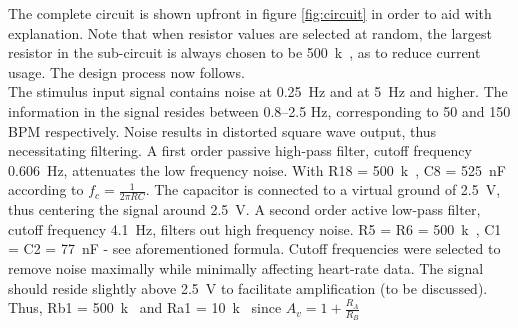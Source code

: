 The complete circuit is shown upfront in figure \ref{fig:circuit} in order to aid with explanation. Note that when resistor values are selected at random, the largest resistor in the sub-circuit is always chosen to be \SI{500}{k\Omega}, as to reduce current usage. The design process now follows.\\
The stimulus input signal contains noise at \SI{0.25}{Hz} and at \SI{5}{Hz} and higher. The information in the signal resides between \numrange{0.8}{2.5} \si{Hz}, corresponding to 50 and 150 BPM respectively. Noise results in distorted square wave output, thus necessitating filtering. A first order passive high-pass filter, cutoff frequency \SI{0.606}{Hz}, attenuates the low frequency noise. With R18 = \SI{500}{k\Omega}, C8 = \SI{525}{nF} according to $f_{c} = \frac{1}{2\pi R C}$. The capacitor is connected to a virtual ground of \SI{2.5}{V}, thus centering the signal around \SI{2.5}{V}. A second order active low-pass filter, cutoff frequency \SI{4.1}{Hz}, filters out high frequency noise. R5 = R6 = \SI{500}{k\Omega}, C1 = C2 = \SI{77}{nF} - see aforementioned formula. Cutoff frequencies were selected to remove noise maximally while minimally affecting heart-rate data. The signal should reside slightly above \SI{2.5}{V} to facilitate amplification (to be discussed). Thus, Rb1 = \SI{500}{k\Omega} and Ra1 = \SI{10}{k\Omega} since $A_v=1+\frac{R_{A}}{R_{B}}$ 
